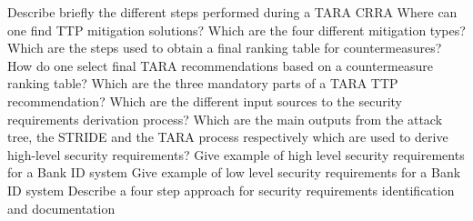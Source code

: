 \begin{questions}
\question{} Describe briefly the different steps performed during a TARA CRRA
\question{} Where can one find TTP mitigation solutions?
\question{} Which are the four different mitigation types?
\question{} Which are the steps used to obtain a final ranking table for countermeasures?
\question{} How do one select final TARA recommendations based on a countermeasure ranking table?
\question{} Which are the three mandatory parts of a TARA TTP recommendation?
\question{} Which are the different input sources to the security requirements derivation process?
\question{} Which are the main outputs from the attack tree, the STRIDE and the TARA process respectively which are used to derive high-level security requirements?
\question{} Give example of high level security requirements for a Bank ID system
\question{} Give example of low level security requirements  for a Bank ID system
\question{} Describe a four step approach for security requirements identification and documentation
\end{questions}

